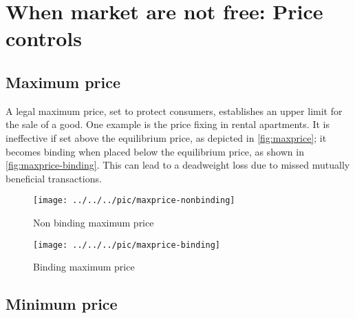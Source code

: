 %




\pbn
\section{When market are not free: Price controls}\label{sec:pricecontrols}
\subsection{Maximum price}

A legal maximum price, set to protect consumers, establishes an upper limit for the sale of a good. One example is the price fixing in rental apartments. It is ineffective if set above the equilibrium price, as depicted in \autoref{fig:maxprice}; it becomes binding when placed below the equilibrium price, as shown in \autoref{fig:maxprice-binding}. This can lead to a deadweight loss due to missed mutually beneficial transactions.

\begin{figure}\centering
	\texttt{[image: ../../../pic/maxprice-nonbinding]}
	\caption{Non binding maximum price}\label{fig:maxprice}
\end{figure}
\pbn

\begin{figure}\centering
	\texttt{[image: ../../../pic/maxprice-binding]}
	\caption{Binding maximum price}\label{fig:maxprice-binding}
\end{figure}

\subsection{Minimum price}

